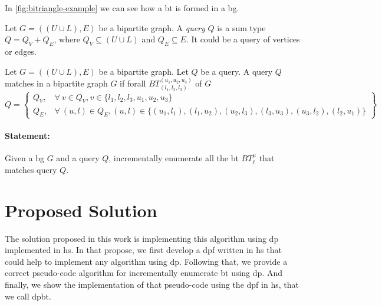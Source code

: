 

In \autoref{fig:bitriangle-example} we can see how a \acrshort{bt} is formed in a \acrshort{bg}.

\begin{definition}[Query]
Let $G=((U\cup L),E)$ be a bipartite graph. 
A \textit{query} $Q$ is a sum type $Q = Q_V + Q_E$, where $Q_V \subseteq (U \cup L)$ and $Q_E \subseteq E$. 
It could be a query of vertices or edges.
\end{definition}

\begin{definition}
  Let $G=((U\cup L),E)$ be a bipartite graph.
  Let $Q$ be a query.
  A query $Q$ matches in a bipartite graph $G$ if forall $BT_{(l_1,l_2,l_3)}^{(u_1,u_2,u_3)}$ of $G$
  \[
    Q = \left\{\begin{array}{lr}
      Q_V, & \forall\ v \in Q_V, v \in \{l_1,l_2,l_3,u_1,u_2,u_3\}\\
      Q_E, & \forall\ (u,l) \in Q_E, (u,l) \in \{(u_1, l_1), (l_1,u_2), (u_2, l_3), (l_3,u_3), (u_3, l_2), (l_2,u_1)\} 
      \end{array}\right\} 
  \]
  \end{definition}
  
\paragraph{Statement:}Given a \acrlong{bg} $G$ and a query $Q$, incrementally enumerate all the \acrlong{bt} $BT_{\ell}^{\mu}$ that matches query $Q$.

\section{Proposed Solution}
The solution proposed in this work is implementing this algorithm using \acrfull{dp} implemented in \acrfull{hs}.
In that propose, we first develop a \acrlong{dpf} written in \acrlong{hs} that could help to implement any algorithm using \acrshort{dp}.
Following that, we provide a correct pseudo-code algorithm for incrementally enumerate \acrshort{bt} using \acrshort{dp}. And finally, we  
show the implementation of that pseudo-code using the \acrshort{dpf} in \acrshort{hs}, that we call \acrfull{dpbt}.


